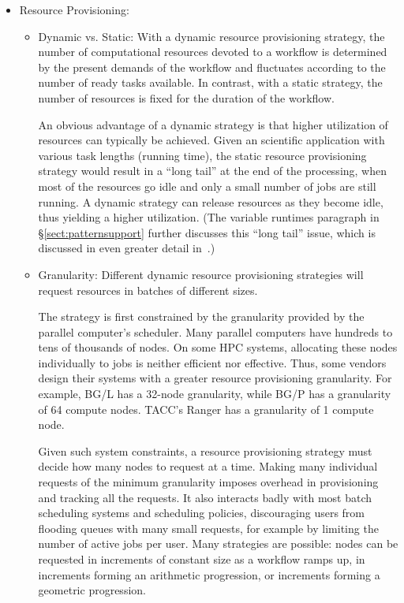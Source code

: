 \documentclass[10pt,letterpaper]{article}
\begin{document}
\begin{itemize}
  \item Resource Provisioning:

    \begin{itemize}
      \item Dynamic vs. Static:
        With a dynamic resource provisioning strategy, the number of computational
        resources devoted to a workflow is determined by the present demands of the workflow
        and fluctuates according to the number of ready tasks available.  In contrast, with a 
        static strategy, the number of resources is fixed for the duration of the workflow.

	An obvious advantage of a dynamic strategy is that higher utilization of resources can typically be achieved. Given an scientific application with various task lengths (running time), the static resource provisioning strategy would result in a ``long tail'' at the end of the processing, when most of the resources go idle and only a small number of jobs are still running. A dynamic strategy can release resources as they become idle, thus yielding a higher utilization.  (The variable runtimes paragraph in \S\ref{sect:patternsupport} further discusses this ``long tail'' issue, which is discussed in even greater detail in~\cite{armstrong-10}.)
      \item Granularity:
	Different dynamic resource provisioning strategies will request resources in
        batches of different sizes.  

        The strategy is first constrained by the granularity provided by the parallel computer's scheduler.  Many parallel computers have hundreds to tens of thousands of nodes.  On some HPC systems, 
        allocating these nodes individually to jobs is neither efficient nor effective. 
        Thus, some vendors design their systems with a greater resource provisioning 
        granularity. For example, BG/L has a 32-node granularity, while BG/P has a 
        granularity of 64 compute nodes. TACC's Ranger has a granularity of 1 compute node.

        Given such system constraints, a resource provisioning strategy must decide how many
        nodes to request at a time.  Making many individual requests of the minimum granularity
        imposes overhead in provisioning and tracking all the requests.  It also interacts
        badly with most batch scheduling systems and scheduling policies, discouraging
        users from flooding queues with many small requests, for example by limiting the number
        of active jobs per user.  Many strategies are possible: nodes can be requested in
        increments of constant size as a workflow ramps up, in increments forming an arithmetic
        progression, or increments forming a geometric progression.



\end{itemize}
\end{itemize}
\end{document}
